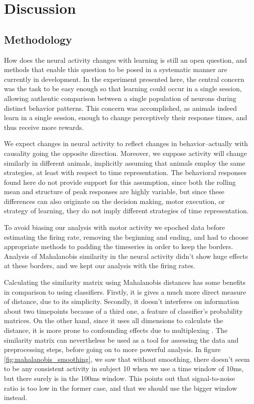 \chapter{Discussion}
\label{chap:results}

\section{Methodology}
How does the neural activity changes with learning is still an open question, and methods that enable this question to be posed in a systematic manner are currently in development. In the experiment presented here, the central concern was the task to be easy enough so that learning could occur in a single session, allowing authentic comparison between a single population of neurons during distinct behavior patterns. This concern was accomplished, as animals indeed learn in a single session, enough to change perceptively their response times, and thus receive more rewards. 

We expect changes in neural activity to reflect changes in behavior--actually with causality going the opposite direction. Moreover, we suppose activity will change similarly in different animals, implicitly assuming that animals employ the same strategies, at least with respect to time representation. The behavioral responses found here do not provide support for this assumption, since both the rolling mean and structure of peak responses are highly variable, but since these differences can also originate on the decision making, motor execution, or strategy of learning, they do not imply different strategies of time representation.

To avoid biasing our analysis with motor activity we epoched data before estimating the firing rate, removing the beginning and ending, and had to choose appropriate methods to padding the timeseries in order to keep the borders. Analysis of Mahalanobis similarity in the neural activity didn't show huge effects at these borders, and we kept our analysis with the firing rates. 

Calculating the similarity matrix using Mahalanobis distances has some benefits in comparison to using classifiers. Firstly, it is gives a much more direct measure of distance, due to its simplicity. Secondly, it doesn't interferes on information about two timepoints because of a third one, a feature of classifier's probability matrices. On the other hand, since it uses all dimensions to calculate the distance, it is more prone to confounding effects due to multiplexing \cite{gu2015oscillatory}. The similarity matrix can nevertheless be used as a tool for assessing the data and preprocessing steps, before going on to more powerful analysis. In figure \ref{fig:mahalanobis_smoothing}, we saw that without smoothing, there doesn't seem to be any consistent activity in subject 10 when we use a time window of 10ms, but there surely is in the 100ms window. This points out that signal-to-noise ratio is too low in the former case, and that we should use the bigger window instead. %

